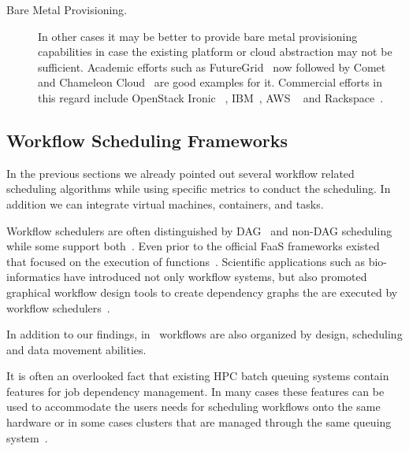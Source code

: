 \documentclass[final,5p,times,twocolumn]{elsarticle}
\begin{document}
\begin{description}
\item[Bare Metal Provisioning.] In other cases it may be better to
  provide bare metal provisioning capabilities in case the
  existing platform or cloud abstraction may not be sufficient.
  Academic efforts such as FutureGrid~\cite{fox2013futuregrid} now
  followed by Comet~\cite{las-comet} and Chameleon Cloud~\cite{Chameleoncloud2019} 
  are good examples for it. Commercial
  efforts in this regard include OpenStack Ironic
 ~\cite{OpenstackIronic2019}, IBM~\cite{IBMBareMetal2019}, AWS
 ~\cite{AWS2019} and Rackspace~\cite{Rackspace2019}.

\end{description}







\subsection{Workflow Scheduling Frameworks} 
\label{sec:workflow}



In the previous sections we already pointed out several workflow
related scheduling algorithms while using specific metrics to conduct
the scheduling. In addition we can integrate virtual machines,
containers, and tasks.

Workflow schedulers are often distinguished by
DAG~\cite{deelman2005pegasus,deelman2004pegasus,thain2005distributed}
and non-DAG scheduling while some support
both~\cite{las-karajan,las-cogkit-1,las06-workflow-book}. Even prior
to the official FaaS frameworks existed that focused on the execution
of functions~\cite{las-infogram}.  Scientific applications such as
bio-informatics have introduced not only workflow systems, but also
promoted graphical workflow design tools to create dependency graphs
the are executed by workflow
schedulers~\cite{oinn2004taverna,tan2010comparison}.
  
In addition to our findings, in~\cite{yu2005taxonomy} workflows are
also organized by design, scheduling and data movement abilities.

It is often an overlooked fact that existing HPC batch queuing systems
contain features for job dependency management. In many cases these
features can be used to accommodate the users needs for scheduling
workflows onto the same hardware or in some cases clusters that are
managed through the same queuing
system~\cite{www-lsf,www-moab,www-univa-GE-manual,www-pbs-manual}.
\end{document}
